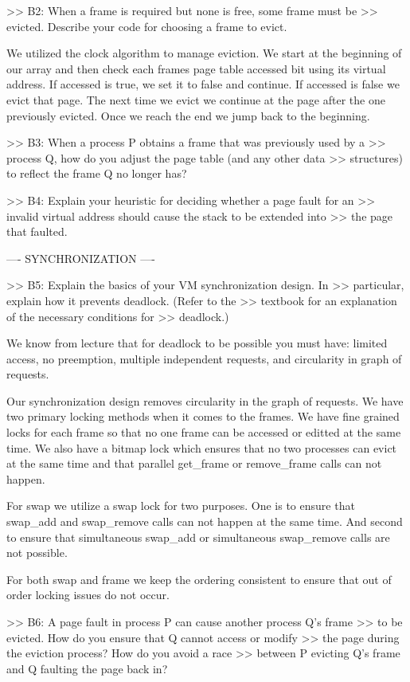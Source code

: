 >> B2: When a frame is required but none is free, some frame must be
>> evicted.  Describe your code for choosing a frame to evict.

 We utilized the clock algorithm to manage eviction. We start at the beginning
 of our array and then check each frames page table accessed bit using its
 virtual address. If accessed is true, we set it to false and continue. If
 accessed is false we evict that page. The next time we evict we continue
 at the page after the one previously evicted. Once we reach the end we jump
 back to the beginning.


>> B3: When a process P obtains a frame that was previously used by a
>> process Q, how do you adjust the page table (and any other data
>> structures) to reflect the frame Q no longer has?


>> B4: Explain your heuristic for deciding whether a page fault for an
>> invalid virtual address should cause the stack to be extended into
>> the page that faulted.

---- SYNCHRONIZATION ----

>> B5: Explain the basics of your VM synchronization design.  In
>> particular, explain how it prevents deadlock.  (Refer to the
>> textbook for an explanation of the necessary conditions for
>> deadlock.)

We know from lecture that for deadlock to be possible you must have: limited 
access, no preemption, multiple independent requests, and circularity in 
graph of requests. 

Our synchronization design removes circularity in the graph of requests.
We have two primary locking methods when it comes to the frames. We have
fine grained locks for each frame so that no one frame can be accessed
or editted at the same time. We also have a bitmap lock which ensures that
no two processes can evict at the same time and that parallel get_frame
or remove_frame calls can not happen. 

For swap we utilize a swap lock for two purposes. One is to ensure that
swap_add and swap_remove calls can not happen at the same time. And second
to ensure that simultaneous swap_add or simultaneous swap_remove calls
are not possible. 

For both swap and frame we keep the ordering consistent
to ensure that out of order locking issues do not occur. 

>> B6: A page fault in process P can cause another process Q's frame
>> to be evicted.  How do you ensure that Q cannot access or modify
>> the page during the eviction process?  How do you avoid a race
>> between P evicting Q's frame and Q faulting the page back in?

